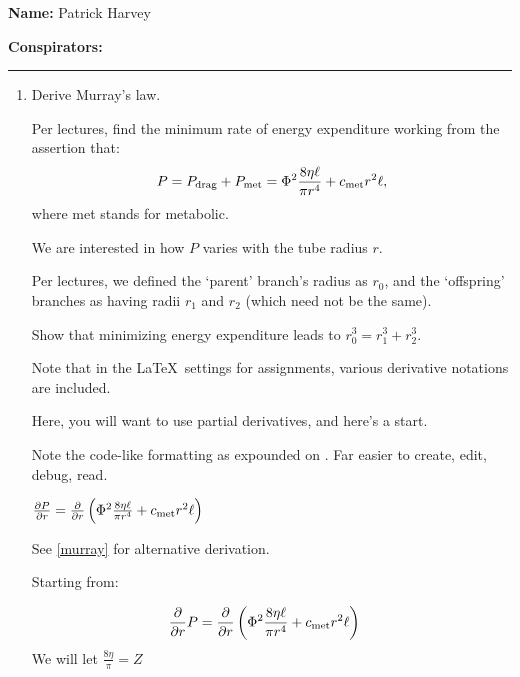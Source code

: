 \textbf{Name: } Patrick Harvey\\

\medskip

\textbf{Conspirators:} 

\medskip
\medskip

\hrule

\medskip


\begin{enumerate}

\item
  Derive Murray's law.

  Per lectures, find the minimum rate of energy expenditure
  working from the assertion that:
  \label{*}$$
  P
  =
  P_{\textnormal{drag}} + P_{\textnormal{met}}
  =
  \Phi^{2}
  \frac{
    8 \eta \ell
  }{
    \pi r^{4}
  }
  +
  c_{\textnormal{met}}
  r^{2}
  \ell,
  $$
  where met stands for metabolic.

  We are interested in how $P$ varies with the tube radius $r$.

  Per lectures, we defined the `parent' branch's radius as $r_{0}$,
  and the `offspring' branches as having radii $r_{1}$ and $r_{2}$
  (which need not be the same).

  Show that minimizing energy expenditure leads to
  $r_{0}^{3} = r_{1}^{3} + r_{2}^{3}$.

  Note that in the \LaTeX\ settings for assignments, various derivative notations
  are included.

  Here, you will want to use partial derivatives, and here's a start.

  Note the code-like formatting as expounded on
  .
  Far easier to create, edit, debug, read.

  \begin{LTXexample}
      $
    \frac{\partial P}{\partial r}
    = 
    \frac{\partial }{\partial r} 
    \left( 
    \Phi^{2}
    \frac{
      8 \eta \ell
    }{
      \pi r^{4}
    }
    +
    c_{\textnormal{met}}
    r^{2}
    \ell
    \right)
    $
  \end{LTXexample}
  
   \solutionstart

   See \ref{murray} for alternative derivation.
   
    Starting from:
    
    \begin{align*}
       \frac{\partial }{\partial r} P
       &= 
       \frac{\partial }{\partial r} 
       \left( 
       \Phi^{2}
       \frac{
            8 \eta \ell
       }{
            \pi r^{4}
       }
       +
       c_{\textnormal{met}}
       r^{2}
       \ell
       \right)
       \end{align*}
       We will let $\frac{8\eta}{\pi}=Z$
       

\end{enumerate}
